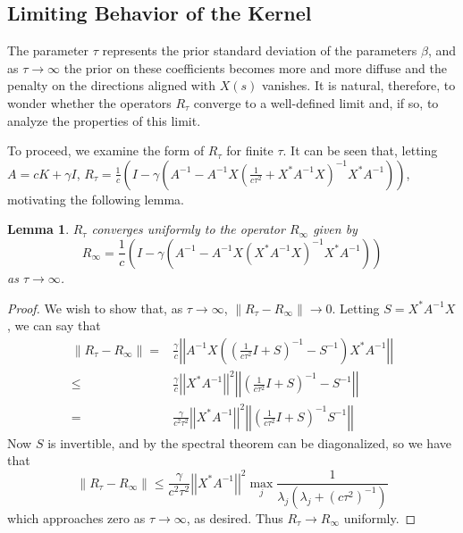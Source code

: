 \documentclass[ejsv2,preprint]{imsart}
\newtheorem{lemma}{Lemma}[section]
\newcommand{\norm}[1]{\left|\left|  #1 \right| \right|}
\begin{document}
\subsection{Limiting Behavior of the Kernel}

The parameter $\tau$ represents the prior standard deviation of the parameters $\beta$, and as $\tau\to\infty$ the prior on these coefficients becomes more and more diffuse and the penalty on the directions aligned with $X(s)$ vanishes. It is natural, therefore, to wonder whether the operators $R_\tau$ converge to a well-defined limit and, if so, to analyze the properties of this limit. 

To proceed, we examine the form of $R_\tau$ for finite $\tau$. It can be seen that, letting $A=cK+\gamma I$, $R_\tau=\frac{1}{c}\left(I -\gamma\left(A^{-1}-A^{-1}X\left(\frac{1}{c\tau^2}+X^*A^{-1}X\right)^{-1}X^*A^{-1}\right)\right)$, motivating the following lemma.
\begin{lemma}\label{lemma:Rinfty}
    $R_\tau$ converges uniformly to the operator $R_{\infty}$ given by
    \begin{equation}
       R_\infty=\frac{1}{c}\left(I -\gamma\left(A^{-1}-A^{-1}X\left(X^*A^{-1}X\right)^{-1}X^*A^{-1}\right)\right) 
    \end{equation}
    as $\tau\to\infty$.
\end{lemma}
\begin{proof}
We wish to show that, as $\tau\to\infty$, $\|R_\tau-R_\infty\|\to 0$. Letting $S=X^*A^{-1}X$, we can say that
\begin{equation}
\begin{split}
    \|R_\tau-R_\infty\| = &\frac{\gamma}{c}\norm{ A^{-1}X\left(\left(\frac{1}{c\tau^2}I+S\right)^{-1}-S^{-1}\right)X^*A^{-1}}\\
    \le & \frac{\gamma}{c}\norm{X^*A^{-1}}^2\norm{\left(\frac{1}{c\tau^2}I+S\right)^{-1}-S^{-1}}\\
    = &\frac{\gamma}{c^2\tau^2}\norm{X^*A^{-1}}^2 \norm{\left(\frac{1}{c\tau^2}I+S\right)^{-1}S^{-1}}
    \end{split}
\end{equation}
Now $S$ is invertible, and by the spectral theorem can be diagonalized, so we have that
\begin{equation}
    \|R_\tau-R_\infty\| \le \frac{\gamma}{c^2\tau^2}\norm{X^*A^{-1}}^2 \underset{j}{\max}\frac{1}{\lambda_j(\lambda_j+(c\tau^2)^{-1})}
\end{equation}
which approaches zero as $\tau\to\infty$, as desired. Thus $R_\tau \to R_\infty$ uniformly.
\end{proof}
\end{document}
